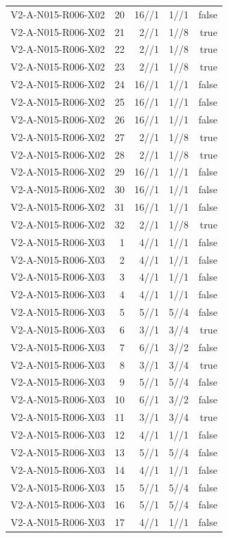 {\begin{longtable}{lrrrr}
V2-A-N015-R006-X02 & 20 & 16//1 & 1//1 & false \\
V2-A-N015-R006-X02 & 21 & 2//1 & 1//8 & true \\
V2-A-N015-R006-X02 & 22 & 2//1 & 1//8 & true \\
V2-A-N015-R006-X02 & 23 & 2//1 & 1//8 & true \\
V2-A-N015-R006-X02 & 24 & 16//1 & 1//1 & false \\
V2-A-N015-R006-X02 & 25 & 16//1 & 1//1 & false \\
V2-A-N015-R006-X02 & 26 & 16//1 & 1//1 & false \\
V2-A-N015-R006-X02 & 27 & 2//1 & 1//8 & true \\
V2-A-N015-R006-X02 & 28 & 2//1 & 1//8 & true \\
V2-A-N015-R006-X02 & 29 & 16//1 & 1//1 & false \\
V2-A-N015-R006-X02 & 30 & 16//1 & 1//1 & false \\
V2-A-N015-R006-X02 & 31 & 16//1 & 1//1 & false \\
V2-A-N015-R006-X02 & 32 & 2//1 & 1//8 & true \\
V2-A-N015-R006-X03 & 1 & 4//1 & 1//1 & false \\
V2-A-N015-R006-X03 & 2 & 4//1 & 1//1 & false \\
V2-A-N015-R006-X03 & 3 & 4//1 & 1//1 & false \\
V2-A-N015-R006-X03 & 4 & 4//1 & 1//1 & false \\
V2-A-N015-R006-X03 & 5 & 5//1 & 5//4 & false \\
V2-A-N015-R006-X03 & 6 & 3//1 & 3//4 & true \\
V2-A-N015-R006-X03 & 7 & 6//1 & 3//2 & false \\
V2-A-N015-R006-X03 & 8 & 3//1 & 3//4 & true \\
V2-A-N015-R006-X03 & 9 & 5//1 & 5//4 & false \\
V2-A-N015-R006-X03 & 10 & 6//1 & 3//2 & false \\
V2-A-N015-R006-X03 & 11 & 3//1 & 3//4 & true \\
V2-A-N015-R006-X03 & 12 & 4//1 & 1//1 & false \\
V2-A-N015-R006-X03 & 13 & 5//1 & 5//4 & false \\
V2-A-N015-R006-X03 & 14 & 4//1 & 1//1 & false \\
V2-A-N015-R006-X03 & 15 & 5//1 & 5//4 & false \\
V2-A-N015-R006-X03 & 16 & 5//1 & 5//4 & false \\
V2-A-N015-R006-X03 & 17 & 4//1 & 1//1 & false \\

\end{longtable}}
